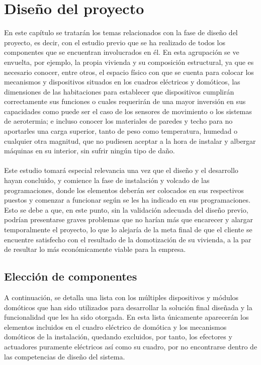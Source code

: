 \chapter{Diseño del proyecto}

En este capítulo se tratarán los temas relacionados con la fase de diseño del proyecto, es decir, con el estudio previo que se ha realizado de todos los componentes que se encuentran involucrados en él. En esta agrupación se ve envuelta, por ejemplo, la propia vivienda y su composición estructural, ya que es necesario conocer, entre otros, el espacio físico con que se cuenta para colocar los mecanismos y dispositivos situados en los cuadros eléctricos y domóticos, las dimensiones de las habitaciones para establecer que dispositivos cumplirán correctamente sus funciones o cuales requerirán de una mayor inversión en sus capacidades como puede ser el caso de los sensores de movimiento o los sistemas de aerotermia; e incluso conocer los materiales de paredes y techo para no aportarles una carga superior, tanto de peso como temperatura, humedad o cualquier otra magnitud, que no pudiesen aceptar a la hora de instalar y albergar máquinas en su interior, sin sufrir ningún tipo de daño.\\\\
Este estudio tomará especial relevancia una vez que el diseño y el desarrollo hayan concluido, y comience la fase de instalación y volcado de las programaciones, donde los elementos deberán ser colocados en sus respectivos puestos y comenzar a funcionar según se les ha indicado en sus programaciones. Esto se debe a que, en este punto, sin la validación adecuada del diseño previo, podrían presentarse graves problemas que no harían más que encarecer y alargar temporalmente el proyecto, lo que lo alejaría de la meta final de que el cliente se encuentre satisfecho con el resultado de la domotización de su vivienda, a la par de resultar lo más económicamente viable para la empresa.

\section{Elección de componentes}

A continuación, se detalla una lista con los múltiples dispositivos y módulos domóticos que han sido utilizados para desarrollar la solución final diseñada y la funcionalidad que les ha sido otorgada. En esta lista únicamente aparecerán los elementos incluidos en el cuadro eléctrico de domótica y los mecanismos domóticos de la instalación, quedando excluidos, por tanto, los efectores y actuadores puramente eléctricos así como su cuadro, por no encontrarse dentro de las competencias de diseño del sistema.

